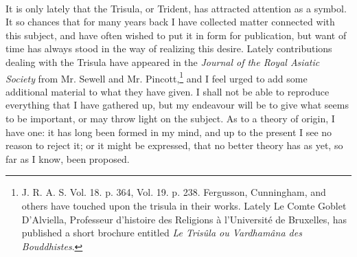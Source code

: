 \documentclass[a4paper, 11pt, oneside, english, landscape, twocolumn]{article}
\begin{document}
\setlength{\parskip}{1mm plus1mm minus1mm}
\clearpage
{}
\paragraph{}
It is only lately that the Trisula, or Trident, has attracted attention as a symbol. It so chances that for many years back I have collected matter connected with this subject, and have often wished to put it in form for publication, but want of time has always stood in the way of realizing this desire. Lately contributions dealing with the Trisula have appeared in the \emph{Journal of the Royal Asiatic Society} from Mr. Sewell and Mr. Pincott,\footnote{J. R. A. S. Vol. 18. p. 364, Vol. 19. p. 238. Fergusson, Cunningham, and others have touched upon the trisula in their works. Lately Le Comte Goblet D'Alviella, Professeur d'histoire des Religions à l'Université de Bruxelles, has published a short brochure entitled \emph{Le Trisûla ou Vardhamâna des Bouddhistes}.} and I feel urged to add some additional material to what they have given. I shall not be able to reproduce everything that I have gathered up, but my endeavour will be to give what seems to be important, or may throw light on the subject. As to a theory of origin, I have one: it has long been formed in my mind, and up to the present I see no reason to reject it; or it might be expressed, that no better theory has as yet, so far as I know, been proposed.
\end{document}
